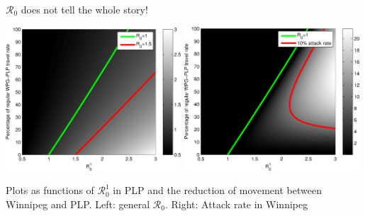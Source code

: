 \documentclass[aspectratio=43]{beamer}
\begin{document}
\begin{frame}{$\mathcal{R}_0$ does not tell the whole story!}
\begin{center}
	\includegraphics[width=0.49\textwidth]{FIGS/invasion_WPG_from_satellites_R01_m_caseR0W05_R0}
	\includegraphics[width=0.49\textwidth]{FIGS/invasion_WPG_from_satellites_R01_m_caseR0W05_attackRate}
\end{center}
\vfill
Plots as functions of $\mathcal{R}_0^1$ in PLP and the reduction of movement between Winnipeg and PLP. Left: general $\mathcal{R}_0$. Right: Attack rate in Winnipeg
\end{frame}



\end{document}
